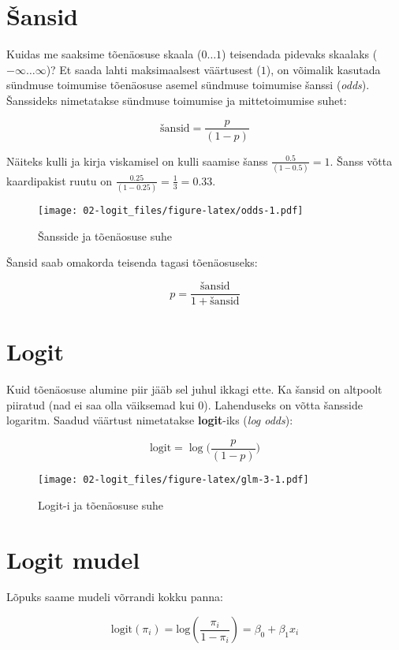 \documentclass[
]{book}
\begin{document}
\hypertarget{ux161ansid}{%
\section{Šansid}\label{ux161ansid}}

Kuidas me saaksime tõenäosuse skaala (\(0 \dots1\)) teisendada pidevaks skaalaks (\(-\infty \dots \infty\))? Et saada lahti maksimaalsest väärtusest (\(1\)), on võimalik kasutada sündmuse toimumise tõenäosuse asemel sündmuse toimumise šanssi (\emph{odds}). Šanssideks nimetatakse sündmuse toimumise ja mittetoimumise suhet:

\[\text{šansid}=\frac{p}{(1-p)}\]

Näiteks kulli ja kirja viskamisel on kulli saamise šanss \(\frac{0.5}{(1-0.5)}=1\). Šanss võtta kaardipakist ruutu on \(\frac{0.25}{(1-0.25)}=\frac{1}{3}=0.33\).

\begin{figure}
\centering
\texttt{[image: 02-logit\_files/figure-latex/odds-1.pdf]}
\caption{\label{fig:odds}Šansside ja tõenäosuse suhe}
\end{figure}

Šansid saab omakorda teisenda tagasi tõenäosuseks:

\[p=\frac{\text{šansid}}{1+\text{šansid}}\]

\hypertarget{logit}{%
\section{Logit}\label{logit}}

Kuid tõenäosuse alumine piir jääb sel juhul ikkagi ette. Ka šansid on altpoolt piiratud (nad ei saa olla väiksemad kui \(0\)). Lahenduseks on võtta šansside logaritm. Saadud väärtust nimetatakse \textbf{logit}-iks (\emph{log odds}):

\[\text{logit}=\log \bigg(\frac{p}{(1-p)}\bigg)\]

\begin{figure}
\centering
\texttt{[image: 02-logit\_files/figure-latex/glm-3-1.pdf]}
\caption{\label{fig:glm-3}Logit-i ja tõenäosuse suhe}
\end{figure}

\hypertarget{logit-mudel}{%
\section{Logit mudel}\label{logit-mudel}}

Lõpuks saame mudeli võrrandi kokku panna:

\[\text{logit}(\pi_i)=\text{log} \left(\dfrac{\pi_i}{1-\pi_i}\right)=\beta_0+\beta_1 x_i\]
\end{document}

